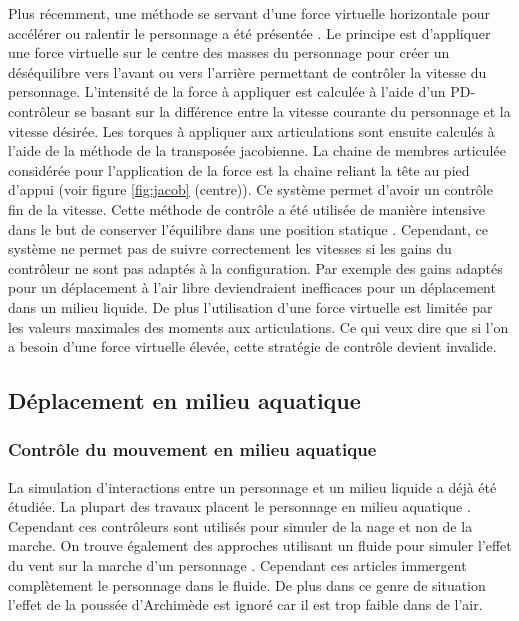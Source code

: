 \documentclass[runningheads,a4paper]{llncs}
\begin{document}
Plus récemment, une méthode se servant d'une force virtuelle horizontale pour accélérer ou ralentir le personnage a été présentée \cite{coros2010generalized}. Le principe est d'appliquer une force virtuelle sur le centre des masses du personnage pour créer un déséquilibre vers l'avant ou vers l'arrière permettant de contrôler la vitesse du personnage. L'intensité de la force à appliquer est calculée à l'aide d'un PD-contrôleur se basant sur la différence entre la vitesse courante du personnage et la vitesse désirée. Les torques à appliquer aux articulations sont ensuite calculés à l'aide de la méthode de la transposée jacobienne.  La chaine de membres articulée considérée pour l'application de la force est la chaine reliant la tête au pied d'appui (voir figure \ref{fig:jacob} (centre)). Ce système permet d'avoir un contrôle fin de la vitesse. Cette méthode de contrôle a été utilisée de manière intensive dans le but de conserver l'équilibre dans une position statique \cite{geijtenbeek2012simple}. Cependant, ce système ne permet pas de suivre correctement les vitesses si les gains du contrôleur ne sont pas adaptés à la configuration. Par exemple des gains adaptés pour un déplacement à l'air libre deviendraient inefficaces pour un déplacement dans un milieu liquide. De plus l'utilisation d'une force virtuelle est limitée par les valeurs maximales des moments aux articulations. Ce qui veux dire que si l'on a besoin d'une force virtuelle élevée, cette stratégie de contrôle devient invalide.

\subsection{Déplacement en milieu aquatique}
\subsubsection{Contrôle du mouvement en milieu aquatique}
La simulation d'interactions entre un personnage et un milieu liquide a déjà été étudiée. La plupart des travaux placent le personnage en milieu aquatique \cite{yang2004layered,kwatra2010fluid,tan2011articulated,si2014realistic}. Cependant ces contrôleurs sont utilisés pour simuler de la nage et non de la marche. On trouve également des approches utilisant un fluide pour simuler l'effet du vent sur la marche d'un personnage \cite{lentine2011creature}. Cependant ces articles immergent complètement le personnage dans le fluide. De plus dans ce genre de situation l'effet de la poussée d'Archimède est ignoré car il est trop faible dans de l'air.
\end{document}
